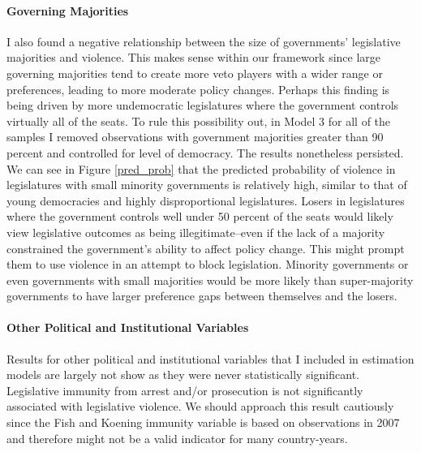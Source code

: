 \documentclass[a4paper]{article}\usepackage{graphicx, color}
\begin{document}
\paragraph{Governing Majorities}
I also found a negative relationship between the size of governments' legislative majorities and violence. This makes sense within our framework since large governing majorities tend to create more veto players with a wider range or preferences, leading to more moderate policy changes. Perhaps this finding is being driven by more undemocratic legislatures where the government controls virtually all of the seats. To rule this possibility out, in Model 3 for all of the samples I removed observations with government majorities greater than 90 percent and controlled for level of democracy. The results nonetheless persisted. We can see in Figure \ref{pred_prob} that the predicted probability of violence in legislatures with small minority governments is relatively high, similar to that of young democracies and highly disproportional legislatures. Losers in legislatures where the government controls well under 50 percent of the seats would likely view legislative outcomes as being illegitimate--even if the lack of a majority constrained the government's ability to affect policy change. This might prompt them to use violence in an attempt to block legislation. Minority governments or even governments with small majorities would be more likely than super-majority governments to have larger preference gaps between themselves and the losers. 

\paragraph{Other Political and Institutional Variables}
Results for other political and institutional variables that I included in estimation models are largely not show as they were never statistically significant. Legislative immunity from arrest and/or prosecution is not significantly associated with legislative violence. We should approach this result cautiously since the Fish and Koening immunity variable is based on observations in 2007 and therefore might not be a valid indicator for many country-years.
\end{document}
